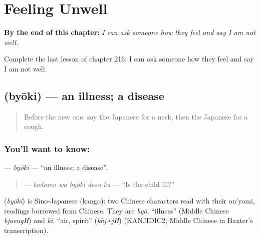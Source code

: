 
\chapter{Feeling Unwell}
\label{ch:ja-feeling-unwell}

\begin{chapteropening}
\textbf{By the end of this chapter:} \emph{I can ask someone how they feel and say I am not well.}

Complete the last lesson of chapter 216: I can ask someone how they feel and say I am not well.
\end{chapteropening}

\section[\texorpdfstring{\ja{びょうき} (byōki)}{びょうき (byōki)}]{ (byōki) — an illness; a disease}

\label{lesson:JA-C216-byouki}



\begin{quote}
Before the new one: say the Japanese for a neck, then the Japanese for a cough.
\end{quote}

\subsection*{You'll want to know: }
\textbf{} — \emph{byōki} — \textquotedblleft{}an illness; a disease\textquotedblright{}.

\begin{quote}
\textbf{ } — \emph{kodomo wa byōki desu ka} — \textquotedblleft{}Is the child ill?\textquotedblright{}
\end{quote}

\begin{cousinweb}
\textbf{} (\emph{byōki}) is Sino-Japanese (kango): two Chinese characters read with their on'yomi, readings borrowed from Chinese. They are \emph{byō}, \textquotedblleft{}illness\textquotedblright{} (Middle Chinese \emph{bjaengH}) and \emph{ki}, \textquotedblleft{}air, spirit\textquotedblright{} (\emph{khj+jH}) (KANJIDIC2; Middle Chinese in Baxter's transcription).
\end{cousinweb}

